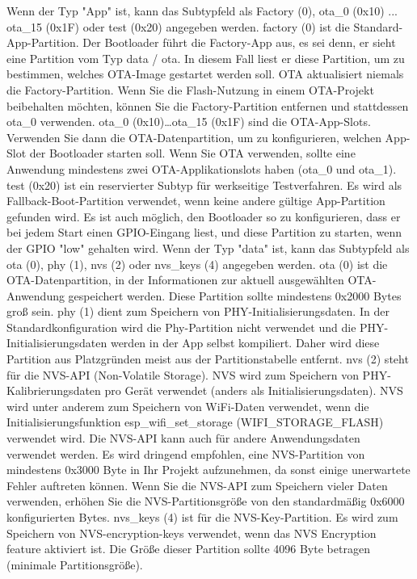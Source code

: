Wenn der Typ "App" ist, kann das Subtypfeld als Factory (0), ota\_0 (0x10) ... ota\_15 (0x1F) oder test (0x20) angegeben werden.
factory (0) ist die Standard-App-Partition. Der Bootloader führt die Factory-App aus, es sei denn, er sieht eine Partition vom Typ data / ota. In diesem Fall liest er diese Partition, um zu bestimmen, welches OTA-Image gestartet werden soll.
OTA aktualisiert niemals die Factory-Partition.
Wenn Sie die Flash-Nutzung in einem OTA-Projekt beibehalten möchten, können Sie die Factory-Partition entfernen und stattdessen ota\_0 verwenden.
ota\_0 (0x10)\dots ota\_15 (0x1F) sind die OTA-App-Slots. Verwenden Sie dann die OTA-Datenpartition, um zu konfigurieren, welchen App-Slot der Bootloader starten soll. Wenn Sie OTA verwenden, sollte eine Anwendung mindestens zwei OTA-Applikationslots haben (ota\_0 und ota\_1).
test (0x20) ist ein reservierter Subtyp für werkseitige Testverfahren. Es wird als Fallback-Boot-Partition verwendet, wenn keine andere gültige App-Partition gefunden wird. Es ist auch möglich, den Bootloader so zu konfigurieren, dass er bei jedem Start einen GPIO-Eingang liest, und diese Partition zu starten, wenn der GPIO "low" gehalten wird.
Wenn der Typ "data" ist, kann das Subtypfeld als ota (0), phy (1), nvs (2) oder nvs\_keys (4) angegeben werden.
ota (0) ist die OTA-Datenpartition, in der Informationen zur aktuell ausgewählten OTA-Anwendung gespeichert werden. Diese Partition sollte mindestens 0x2000 Bytes groß sein.
phy (1) dient zum Speichern von PHY-Initialisierungsdaten.
In der Standardkonfiguration wird die Phy-Partition nicht verwendet und die PHY-Initialisierungsdaten werden in der App selbst kompiliert. Daher wird diese Partition aus Platzgründen meist aus der Partitionstabelle entfernt.
nvs (2) steht für die NVS-API (Non-Volatile Storage).
NVS wird zum Speichern von PHY-Kalibrierungsdaten pro Gerät verwendet (anders als Initialisierungsdaten).
NVS wird unter anderem zum Speichern von WiFi-Daten verwendet, wenn die Initialisierungsfunktion esp\_wifi\_set\_storage (WIFI\_STORAGE\_FLASH) verwendet wird.
Die NVS-API kann auch für andere Anwendungsdaten verwendet werden.
Es wird dringend empfohlen, eine NVS-Partition von mindestens 0x3000 Byte in Ihr Projekt aufzunehmen, da sonst einige unerwartete Fehler auftreten können.
Wenn Sie die NVS-API zum Speichern vieler Daten verwenden, erhöhen Sie die NVS-Partitionsgröße von den standardmäßig 0x6000 konfigurierten Bytes.
nvs\_keys (4) ist für die NVS-Key-Partition.
Es wird zum Speichern von NVS-encryption-keys verwendet, wenn das NVS Encryption feature aktiviert ist.
Die Größe dieser Partition sollte 4096 Byte betragen (minimale Partitionsgröße).

